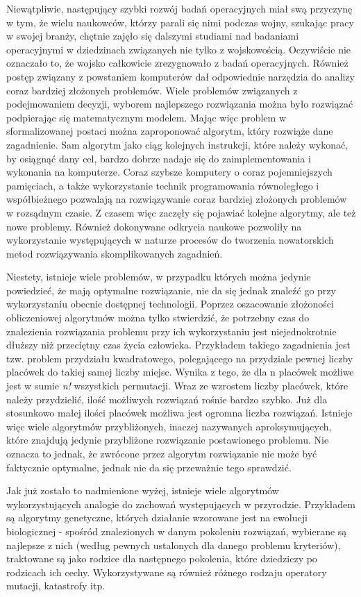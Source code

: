 Niewątpliwie, następujący szybki rozwój badań operacyjnych miał swą przyczynę  w tym, że wielu naukowców, którzy parali się nimi podczas wojny, szukając pracy w swojej branży, chętnie zajęło się dalszymi studiami nad badaniami operacyjnymi w dziedzinach związanych nie tylko z wojskowością. Oczywiście nie oznaczało to, że wojsko całkowicie zrezygnowało z badań operacyjnych. Również postęp związany z powstaniem komputerów dał odpowiednie narzędzia do analizy coraz bardziej złożonych problemów. Wiele problemów związanych z podejmowaniem decyzji, wyborem najlepszego rozwiązania można było rozwiązać podpierając się matematycznym modelem. Mając więc problem w sformalizowanej postaci można zaproponować algorytm, który rozwiąże dane zagadnienie. Sam algorytm jako ciąg kolejnych instrukcji, które należy wykonać, by osiągnąć dany cel, bardzo dobrze nadaje się do zaimplementowania i wykonania na komputerze. Coraz szybsze komputery o coraz pojemniejszych pamięciach, a także wykorzystanie technik programowania równoległego i współbieżnego pozwalają na rozwiązywanie coraz bardziej złożonych problemów w rozsądnym czasie. Z czasem więc zaczęły się pojawiać kolejne algorytmy, ale też nowe problemy. Również dokonywane odkrycia naukowe pozwoliły na wykorzystanie występujących w naturze procesów do tworzenia nowatorskich metod rozwiązywania skomplikowanych zagadnień.

Niestety, istnieje wiele problemów, w przypadku których można jedynie powiedzieć, że mają optymalne rozwiązanie, nie da się jednak znaleźć go przy wykorzystaniu obecnie dostępnej technologii. Poprzez oszacowanie złożoności obliczeniowej algorytmów można tylko stwierdzić, że potrzebny czas do znalezienia rozwiązania problemu przy ich wykorzystaniu jest niejednokrotnie dłuższy niż przeciętny czas życia człowieka. Przykładem takiego zagadnienia jest tzw. problem przydziału kwadratowego, polegającego na przydziale pewnej liczby placówek do takiej samej liczby miejsc. Wynika z tego, że dla n placówek możliwe jest w sumie \textit{n!} wszystkich permutacji. Wraz ze wzrostem liczby placówek, które należy przydzielić, ilość możliwych rozwiązań rośnie bardzo szybko. Już dla stosunkowo małej ilości placówek możliwa jest ogromna liczba rozwiązań. Istnieje  więc wiele algorytmów przybliżonych, inaczej nazywanych aproksymujących, które znajdują jedynie przybliżone rozwiązanie postawionego problemu. Nie oznacza to jednak, że zwrócone przez algorytm rozwiązanie nie może być faktycznie optymalne, jednak nie da się przeważnie tego sprawdzić.

Jak już zostało to nadmienione wyżej, istnieje wiele algorytmów wykorzystujących analogie do zachowań występujących w przyrodzie. Przykładem są algorytmy genetyczne, których działanie wzorowane jest na ewolucji biologicznej - spośród znalezionych w danym pokoleniu rozwiązań, wybierane są najlepsze z nich (według pewnych ustalonych dla danego problemu kryteriów), traktowane są jako rodzice dla następnego pokolenia, które dziedziczy po rodzicach ich cechy. Wykorzystywane są również różnego rodzaju operatory mutacji, katastrofy itp. 

